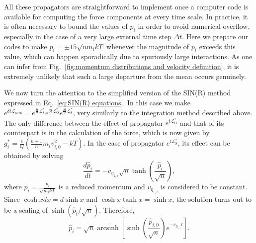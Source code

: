 \documentclass[
aip,
jcp,
reprint,
]{revtex4-1}
\DeclareMathOperator\arcsinh{arcsinh}
\newcommand{\diff}[2]{\frac{\partial #2}{\partial #1}} %
\newcommand{\Liu}{\mathcal{L}}
\newcommand{\nn}{n}
\begin{document}
All these propagators are straightforward to implement once a computer code is available for computing the force components at every time scale.
In practice, it is often necessary to bound the values of $p_i$ in order to avoid numerical overflow, especially in the case of a very large external time step $\Delta t$.
Here we prepare our codes to make $p_i = \pm 15 \sqrt{n m_i kT}$ whenever the magnitude of $p_i$ exceeds this value, which can happen sporadically due to spuriously large interactions.
As one can infer from Fig.~\ref{fig:momentum distributions and velocity definition}, it is extremely unlikely that such a large departure from the mean occurs genuinely.


We now turn the attention to the simplified version of the SIN(R) method expressed in Eq.~\eqref{eq:SIN(R) equations}.
In this case we make $e^{\delta t \Liu_\mathrm{bath}} = e^{\frac{\delta t}{2} \mathcal{L}_\mathrm{S}^\ast} e^{\delta t \mathcal{L}_\mathrm{O}^\ast} e^{\frac{\delta t}{2} \mathcal{L}_\mathrm{S}^\ast}$, very similarly to the integration method described above.
The only difference between the effect of propagator $e^{t \mathcal{L}_\mathrm{O}^\ast}$ and that of its counterpart is in the calculation of the force, which is now given by $g_i^\ast = \frac{1}{Q}(\frac{\nn+1}{\nn} m_i v_{i,0}^2 - kT)$.
In the case of propagator $e^{t \mathcal{L}_\mathrm{S}^\ast}$, its effect can be obtained by solving
\begin{equation*}
\frac{d \hat{p}_i}{d t} = - v_{\eta_{1,i}} \sqrt{\nn} \tanh\left(\frac{\hat{p}_i}{\sqrt{\nn}}\right),
\end{equation*}
where $\hat{p}_i = \frac{p_i}{\sqrt{m_i kT}}$ is a reduced momentum and $v_{\eta_{1,i}}$ is considered to be constant.
Since $\cosh x dx = d \sinh x$ and $\cosh x \tanh x = \sinh x$, the solution turns out to be a scaling of $\sinh\left({\hat{p}_i}/{\sqrt{\nn}}\right)$.
Therefore,
\begin{equation}
\label{eq:hyperbolic sine scaling}
\hat{p}_i = \sqrt{\nn} \arcsinh\left[\sinh \left(\frac{\hat{p}_{i,0}}{\sqrt{\nn}}\right) e^{-v_{\eta_{1,i}} t}\right].
\end{equation}
\end{document}
